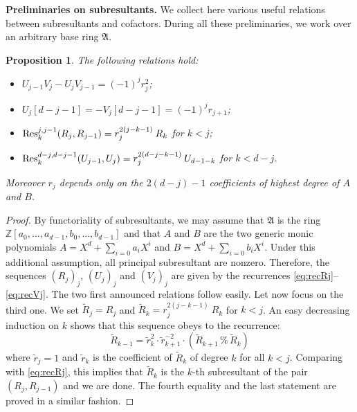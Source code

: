 \documentclass{jT}
\numberwithin{equation}{section}
\newtheorem{prop}[theo]{Proposition}
\theoremstyle{definition}
\newcommand{\Z}{\mathbb Z}
\newcommand{\ring}{\mathfrak A}
\renewcommand{\Res}{\text{\rm Res}}
\begin{document}
\medskip

\noindent
\textbf{Preliminaries on subresultants.}
We collect here various useful relations between subresultants and 
cofactors. During all these preliminaries, we work over an arbitrary
base ring $\ring$.

\begin{prop}
\label{prop:relations}
The following relations hold:
\begin{itemize}
\setlength\itemsep{0.1em}
\item $U_{j-1} V_j - U_j V_{j-1} = (-1)^j r_j^2$;
\item $U_j[d{-}j{-}1] = -V_j[d{-}j{-}1] = (-1)^j r_{j+1}$;
\item $\Res^{j,j-1}_k(R_j, R_{j-1}) = r_j^{2(j-k-1)} \: R_k$ for $k < j$;
\item $\Res^{d-j,d-j-1}_k(U_{j-1}, U_j) = r_j^{2(d-j-k-1)} \: U_{d-1-k}$
for $k < d-j$.
\end{itemize}
Moreover $r_j$ depends only on the $2(d-j)-1$ coefficients of highest 
degree of $A$ and $B$.
\end{prop}

\begin{proof}

By functoriality of subresultants, we may assume that $\ring$ is the
ring $\Z[a_0, 
\ldots, a_{d-1}, b_0, \ldots, b_{d-1}]$ and that $A$ and $B$ are the two 
generic monic polynomials $A = X^d + \sum_{i=0} a_i X^i$ and $B = X^d + 
\sum_{i=0} b_i X^i$. Under this additional assumption, all principal
subresultant are nonzero. Therefore, the sequences $(R_j)_j$, $(U_j)_j$
and $(V_j)_j$ are given by the recurrences \eqref{eq:recRj}--\eqref{eq:recVj}.
The two first announced relations follow easily. Let now focus on the
third one. We set $\tilde R_j = R_j$ and $\tilde R_k = r_j^{2(j-k-1)} 
\: R_k$ for $k < j$. An easy decreasing induction on $k$ shows that this 
sequence obeys to the recurrence:
$$\tilde R_{k-1} = \tilde r_k^2 \cdot \tilde r_{k+1}^{-2} \cdot 
(\tilde R_{k+1} \,\%\, \tilde R_k)$$
where $\tilde r_j = 1$ and $\tilde r_k$ is the coefficient of $\tilde 
R_k$ of degree $k$ for all $k < j$. Comparing with \eqref{eq:recRj},
this implies that $\tilde R_k$ is the $k$-th subresultant of the pair 
$(R_j, R_{j-1})$ and we are done. The fourth equality and the last
statement are proved in a similar fashion.
\end{proof}
\end{document}
